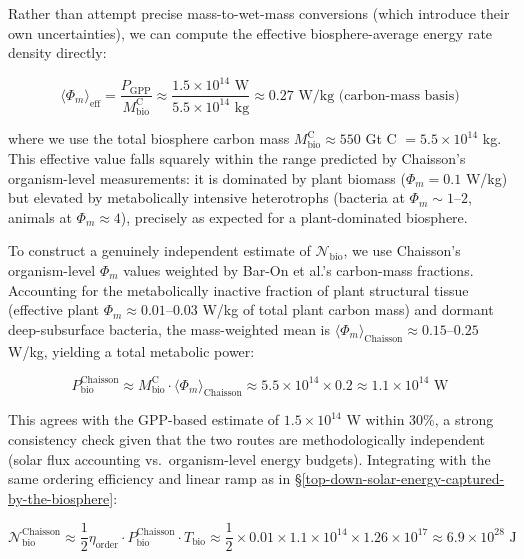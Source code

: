\documentclass[11pt]{article}
\theoremstyle{plain}
\theoremstyle{definition}
\theoremstyle{remark}
\begin{document}
Rather than attempt precise mass-to-wet-mass conversions (which
introduce their own uncertainties), we can compute the effective
biosphere-average energy rate density directly:

\[\langle \Phi_m \rangle_{\text{eff}} = \frac{P_{\text{GPP}}}{M_{\text{bio}}^{\text{C}}} \approx \frac{1.5 \times 10^{14} \text{ W}}{5.5 \times 10^{14} \text{ kg}} \approx 0.27 \text{ W/kg (carbon-mass basis)}\]

where we use the total biosphere carbon mass
\(M_{\text{bio}}^{\text{C}} \approx 550\) Gt C \(= 5.5 \times 10^{14}\)
kg. This effective value falls squarely within the range predicted by
Chaisson's organism-level measurements: it is dominated by plant biomass
(\(\Phi_m = 0.1\) W/kg) but elevated by metabolically intensive
heterotrophs (bacteria at \(\Phi_m \sim 1\)--\(2\), animals at
\(\Phi_m \approx 4\)), precisely as expected for a plant-dominated
biosphere.

To construct a genuinely independent estimate of
\(\mathcal{N}_{\text{bio}}\), we use Chaisson's organism-level
\(\Phi_m\) values weighted by Bar-On et al.'s carbon-mass fractions.
Accounting for the metabolically inactive fraction of plant structural
tissue (effective plant \(\Phi_m \approx 0.01\)--\(0.03\) W/kg of total
plant carbon mass) and dormant deep-subsurface bacteria, the
mass-weighted mean is
\(\langle \Phi_m \rangle_{\text{Chaisson}} \approx 0.15\)--\(0.25\)
W/kg, yielding a total metabolic power:

\[P_{\text{bio}}^{\text{Chaisson}} \approx M_{\text{bio}}^{\text{C}} \cdot \langle \Phi_m \rangle_{\text{Chaisson}} \approx 5.5 \times 10^{14} \times 0.2 \approx 1.1 \times 10^{14} \text{ W}\]

This agrees with the GPP-based estimate of \(1.5 \times 10^{14}\) W
within 30\%, a strong consistency check given that the two routes are
methodologically independent (solar flux accounting vs.~organism-level
energy budgets). Integrating with the same ordering efficiency and
linear ramp as in
§\ref{top-down-solar-energy-captured-by-the-biosphere}:

\[\mathcal{N}_{\text{bio}}^{\text{Chaisson}} \approx \frac{1}{2} \eta_{\text{order}} \cdot P_{\text{bio}}^{\text{Chaisson}} \cdot T_{\text{bio}} \approx \frac{1}{2} \times 0.01 \times 1.1 \times 10^{14} \times 1.26 \times 10^{17} \approx 6.9 \times 10^{28} \text{ J}\]
\end{document}
